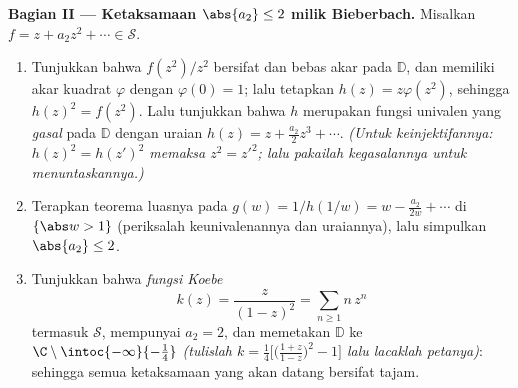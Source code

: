 \begin{problem}
\medskip
\noindent\textbf{Bagian II --- Ketaksamaan $\abs{a_2} \leq
2$ milik Bieberbach.} Misalkan $f = z + a_2z^2 + \cdots \in \mathcal S$.
\begin{enumerate}[resume]
  \item Tunjukkan bahwa $f(z^2)/z^2$ bersifat  dan bebas akar
        pada $\mathbb D$, dan memiliki akar kuadrat 
        $\varphi$ dengan $\varphi(0) = 1$; lalu tetapkan $h(z) =
        z\varphi(z^2)$, sehingga $h(z)^2 = f(z^2)$. Lalu tunjukkan bahwa
        $h$ merupakan fungsi univalen yang \emph{gasal} pada $\mathbb
        D$ dengan uraian $h(z) = z + \frac{a_2}2z^3 +
        \cdots$. \emph{(Untuk keinjektifannya: $h(z)^2 = h(z')^2$
        memaksa $z^2 = z'^2$; lalu pakailah kegasalannya untuk menuntaskannya.)}
  \item Terapkan teorema luasnya pada $g(w) = 1/h(1/w) = w -
        \frac{a_2}{2w} + \cdots$ di $\{\abs w > 1\}$
        (periksalah keunivalenannya dan uraiannya), lalu simpulkan
        $\abs{a_2} \leq 2$.
  \item Tunjukkan bahwa \emph{fungsi Koebe}
        \[
        k(z) = \frac{z}{(1 - z)^2} = \sum_{n\geq1}n\,z^n
        \]
        termasuk $\mathcal S$, mempunyai $a_2 = 2$, dan memetakan
        $\mathbb D$ ke $\C\setminus\intoc{-\infty}{-\frac14}$
        \emph{(tulislah $k = \frac14\bigl[\bigl(\frac{1+z}{1 -
        z}\bigr)^2 - 1\bigr]$ lalu lacaklah petanya)}: sehingga semua
        ketaksamaan yang akan datang bersifat tajam.
\end{enumerate}


\end{problem}
